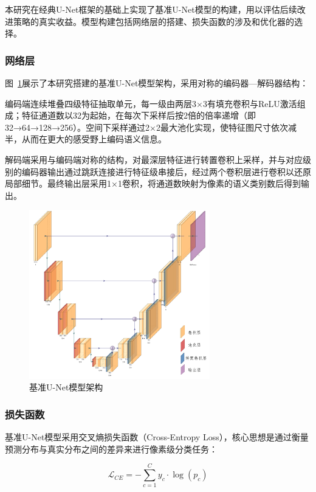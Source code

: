本研究在经典U-Net框架的基础上实现了基准U-Net模型的构建，用以评估后续改进策略的真实收益。模型构建包括网络层的搭建、损失函数的涉及和优化器的选择。

\subsubsection{网络层}

图~\ref{fig:unet_ushape}展示了本研究搭建的基准U-Net模型架构，采用对称的编码器—解码器结构：

编码端连续堆叠四级特征抽取单元，每一级由两层3×3有填充卷积与ReLU激活组成；特征通道数以32为起始，在每次下采样后按2倍的倍率递增（即32→64→128→256）。空间下采样通过2×2最大池化实现，使特征图尺寸依次减半，从而在更大的感受野上编码语义信息。

解码端采用与编码端对称的结构，对最深层特征进行转置卷积上采样，并与对应级别的编码器输出通过跳跃连接进行特征级串接后，经过两个卷积层进行卷积以还原局部细节。最终输出层采用1×1卷积，将通道数映射为像素的语义类别数后得到输出。

\begin{figure}[h]
    \centering
    \includegraphics[width=0.7\textwidth]{fig/Unet_ushape.png}
    \caption{基准U-Net模型架构}
    \label{fig:unet_ushape}
\end{figure}

\subsubsection{损失函数}

基准U-Net模型采用交叉熵损失函数（Cross-Entropy Loss），核心思想是通过衡量预测分布与真实分布之间的差异来进行像素级分类任务：

\begin{equation}
    \mathcal{L}_{C E}=-\sum_{c=1}^{C} y_{c} \cdot \log \left(p_{c}\right)
\end{equation}

